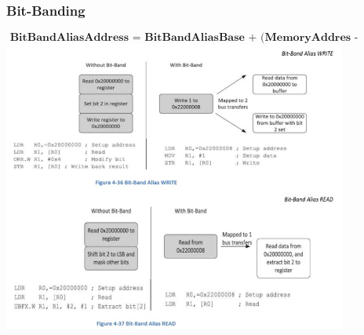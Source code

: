 \subsubsection{Bit-Banding}
\vspace{-0.5cm}
\[\textbf{ BitBandAliasAddress = BitBandAliasBase + (MemoryAddres - BitbandRegionBase)* 32 + 4*BitNumber} \]
\includegraphics[width=0.85\textwidth]{images/bitbanding}